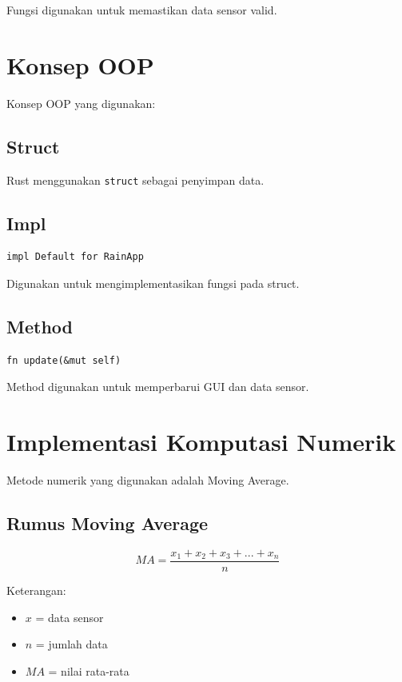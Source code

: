 \documentclass[a4paper,12pt]{article}
\begin{document}
Fungsi digunakan untuk memastikan data sensor valid.

\section{Konsep OOP}

Konsep OOP yang digunakan:

\subsection{Struct}

Rust menggunakan \texttt{struct} sebagai penyimpan data.

\subsection{Impl}

\begin{lstlisting}
impl Default for RainApp
\end{lstlisting}

Digunakan untuk mengimplementasikan fungsi pada struct.

\subsection{Method}

\begin{lstlisting}
fn update(&mut self)
\end{lstlisting}

Method digunakan untuk memperbarui GUI dan data sensor.

\section{Implementasi Komputasi Numerik}

Metode numerik yang digunakan adalah Moving Average.

\subsection{Rumus Moving Average}

\[
MA = \frac{x_1 + x_2 + x_3 + ... + x_n}{n}
\]

Keterangan:
\begin{itemize}
    \item $x$ = data sensor
    \item $n$ = jumlah data
    \item $MA$ = nilai rata-rata
\end{itemize}
\end{document}
